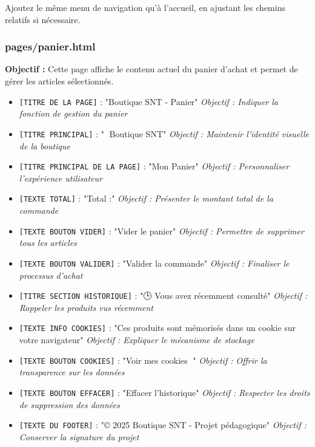 \documentclass[12pt,a4paper]{article}
\begin{document}
Ajoutez le même menu de navigation qu'à l'accueil, en ajustant les chemins relatifs si nécessaire.

\subsubsection{pages/panier.html}

\textbf{Objectif :} Cette page affiche le contenu actuel du panier d'achat et permet de gérer les articles sélectionnés.

\begin{itemize}
\item \texttt{[TITRE DE LA PAGE]} : "Boutique SNT - Panier" \newline \textit{Objectif : Indiquer la fonction de gestion du panier}
\item \texttt{[TITRE PRINCIPAL]} : "🛒 Boutique SNT" \newline \textit{Objectif : Maintenir l'identité visuelle de la boutique}
\item \texttt{[TITRE PRINCIPAL DE LA PAGE]} : "Mon Panier" \newline \textit{Objectif : Personnaliser l'expérience utilisateur}
\item \texttt{[TEXTE TOTAL]} : "Total :" \newline \textit{Objectif : Présenter le montant total de la commande}
\item \texttt{[TEXTE BOUTON VIDER]} : "Vider le panier" \newline \textit{Objectif : Permettre de supprimer tous les articles}
\item \texttt{[TEXTE BOUTON VALIDER]} : "Valider la commande" \newline \textit{Objectif : Finaliser le processus d'achat}
\item \texttt{[TITRE SECTION HISTORIQUE]} : "🕒 Vous avez récemment consulté" \newline \textit{Objectif : Rappeler les produits vus récemment}
\item \texttt{[TEXTE INFO COOKIES]} : "Ces produits sont mémorisés dans un cookie sur votre navigateur" \newline \textit{Objectif : Expliquer le mécanisme de stockage}
\item \texttt{[TEXTE BOUTON COOKIES]} : "Voir mes cookies 🍪" \newline \textit{Objectif : Offrir la transparence sur les données}
\item \texttt{[TEXTE BOUTON EFFACER]} : "Effacer l'historique" \newline \textit{Objectif : Respecter les droits de suppression des données}
\item \texttt{[TEXTE DU FOOTER]} : "© 2025 Boutique SNT - Projet pédagogique" \newline \textit{Objectif : Conserver la signature du projet}
\end{itemize}
\end{document}
